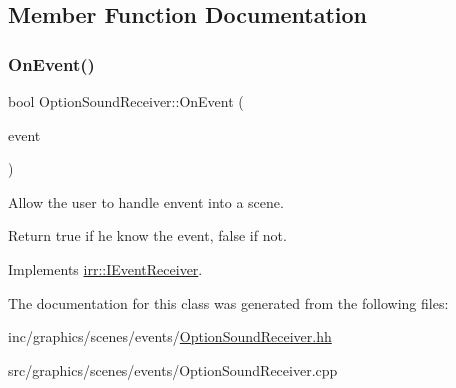 \subsection{Member Function Documentation}
\mbox{\label{classOptionSoundReceiver_ae7c9643b12df38a45d4e3d629274019c}} 
\subsubsection{\texorpdfstring{On\+Event()}{OnEvent()}}
{\footnotesize\ttfamily bool Option\+Sound\+Receiver\+::\+On\+Event (\begin{DoxyParamCaption}\item[{const \hyperlink{structirr_1_1SEvent}{irr\+::\+S\+Event} \&}]{event }\end{DoxyParamCaption})\hspace{0.3cm}{\ttfamily [virtual]}}



Allow the user to handle envent into a scene. 

Return true if he know the event, false if not. 

Implements \hyperlink{classirr_1_1IEventReceiver_a571f744ceffc3b4fe8a81f529163eb97}{irr\+::\+I\+Event\+Receiver}.



The documentation for this class was generated from the following files\+:\begin{DoxyCompactItemize}
\item 
inc/graphics/scenes/events/\hyperlink{OptionSoundReceiver_8hh}{Option\+Sound\+Receiver.\+hh}\item 
src/graphics/scenes/events/Option\+Sound\+Receiver.\+cpp\end{DoxyCompactItemize}
